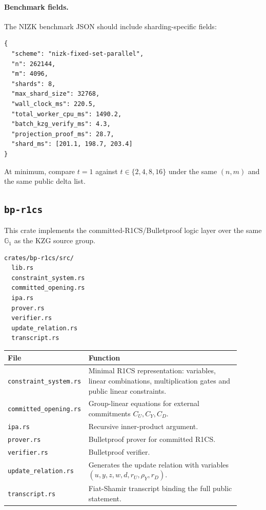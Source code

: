 \documentclass[UTF8,a4paper,11pt]{ctexart}
\newcommand{\G}{\mathbb G}
\begin{document}
\paragraph{Benchmark fields.}
The NIZK benchmark JSON should include sharding-specific fields:
\begin{lstlisting}
{
  "scheme": "nizk-fixed-set-parallel",
  "n": 262144,
  "m": 4096,
  "shards": 8,
  "max_shard_size": 32768,
  "wall_clock_ms": 220.5,
  "total_worker_cpu_ms": 1490.2,
  "batch_kzg_verify_ms": 4.3,
  "projection_proof_ms": 28.7,
  "shard_ms": [201.1, 198.7, 203.4]
}
\end{lstlisting}
At minimum, compare $t=1$ against $t\in\{2,4,8,16\}$ under the same $(n,m)$ and the same public
delta list.

\subsection{\texttt{bp-r1cs}}

This crate implements the committed-R1CS/Bulletproof logic layer over the same $\G_1$ as the KZG source group.

\begin{lstlisting}
crates/bp-r1cs/src/
  lib.rs
  constraint_system.rs
  committed_opening.rs
  ipa.rs
  prover.rs
  verifier.rs
  update_relation.rs
  transcript.rs
\end{lstlisting}

\begin{longtable}{p{0.25\linewidth}p{0.65\linewidth}}
\toprule
File & Function \\
\midrule
\texttt{constraint\_system.rs} & Minimal R1CS representation: variables, linear combinations, multiplication gates and public linear constraints. \\
\texttt{committed\_opening.rs} & Group-linear equations for external commitments $C_U,C_Y,C_D$. \\
\texttt{ipa.rs} & Recursive inner-product argument. \\
\texttt{prover.rs} & Bulletproof prover for committed R1CS. \\
\texttt{verifier.rs} & Bulletproof verifier. \\
\texttt{update\_relation.rs} & Generates the update relation with variables $(u,y,z,w,d,r_U,\rho_Y,r_D)$. \\
\texttt{transcript.rs} & Fiat-Shamir transcript binding the full public statement. \\
\bottomrule
\end{longtable}
\end{document}
